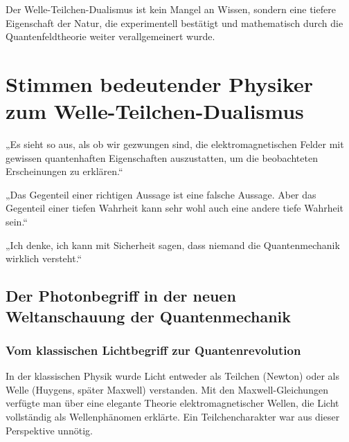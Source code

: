 Der Welle-Teilchen-Dualismus ist kein Mangel an Wissen, sondern eine tiefere Eigenschaft der Natur, die experimentell bestätigt und mathematisch durch die Quantenfeldtheorie weiter verallgemeinert wurde.
\newpage
\noindent

\section*{Stimmen bedeutender Physiker zum Welle-Teilchen-Dualismus}

\begin{tcolorbox}[physikbox, title={Albert Einstein, (1909)\cite{einstein1909}}]
	\label{box:einstein1909}
	„Es sieht so aus, als ob wir gezwungen sind, die elektromagnetischen Felder mit gewissen quantenhaften Eigenschaften auszustatten, um die beobachteten Erscheinungen zu erklären.“
\end{tcolorbox}

\begin{tcolorbox}[physikbox, title={Niels Bohr (1933)\cite{bohr1933}}]
	\label{box:bohr1933}
	„Das Gegenteil einer richtigen Aussage ist eine falsche Aussage. Aber das Gegenteil einer tiefen Wahrheit kann sehr wohl auch eine andere tiefe Wahrheit sein.“\\
\end{tcolorbox}

\begin{tcolorbox}[physikbox, title={Richard P. Feynman (1965) \cite{feynman1965}}]
	\label{box:feynman1965}
	„Ich denke, ich kann mit Sicherheit sagen, dass niemand die Quantenmechanik wirklich versteht.“\\
\end{tcolorbox}

\subsection{Der Photonbegriff in der neuen Weltanschauung der Quantenmechanik}

\subsubsection{Vom klassischen Lichtbegriff zur Quantenrevolution}

In der klassischen Physik wurde Licht entweder als Teilchen (Newton) oder als Welle (Huygens, später Maxwell) verstanden. Mit den Maxwell-Gleichungen verfügte man über eine elegante Theorie elektromagnetischer Wellen, die Licht vollständig als Wellenphänomen erklärte. Ein Teilchencharakter war aus dieser Perspektive unnötig.

